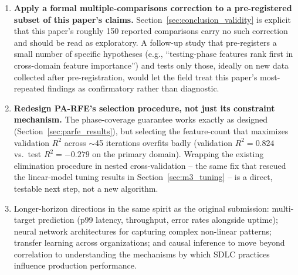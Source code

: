\documentclass[technologies,article,submit,pdftex,moreauthors]{Definitions/mdpi}
\begin{document}
\begin{enumerate}
  count, build duration).
\item \textbf{Apply a formal multiple-comparisons correction to a
  pre-registered subset of this paper's claims.}
  Section~\ref{sec:conclusion_validity} is explicit that this paper's
  roughly 150 reported comparisons carry no such correction and should
  be read as exploratory. A follow-up study that pre-registers a small
  number of specific hypotheses (e.g., ``testing-phase features rank
  first in cross-domain feature importance'') and tests only those,
  ideally on new data collected after pre-registration, would let the
  field treat this paper's most-repeated findings as confirmatory
  rather than diagnostic.
\item \textbf{Redesign PA-RFE's selection procedure, not just its
  constraint mechanism.} The phase-coverage guarantee works exactly as
  designed (Section~\ref{sec:parfe_results}), but selecting the
  feature-count that maximizes validation \(R^2\) across \(\sim\)45
  iterations overfits badly (validation \(R^2=0.824\) vs.\ test
  \(R^2=-0.279\) on the primary domain). Wrapping the existing
  elimination procedure in nested cross-validation -- the same fix
  that rescued the linear-model tuning results in
  Section~\ref{sec:m3_tuning} -- is a direct, testable next step, not
  a new algorithm.
\item Longer-horizon directions in the same spirit as the original
  submission: multi-target prediction (p99 latency, throughput, error
  rates alongside uptime); neural network architectures for capturing
  complex non-linear patterns; transfer learning across organizations;
  and causal inference to move beyond correlation to understanding the
  mechanisms by which SDLC practices influence production performance.
\end{enumerate}
\end{document}
